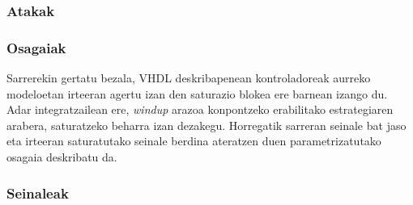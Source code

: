 \subsubsection{Atakak}




\subsubsection{Osagaiak}

Sarrerekin gertatu bezala, VHDL deskribapenean kontroladoreak aurreko modeloetan irteeran agertu izan den saturazio blokea ere barnean izango du. Adar integratzailean ere, \emph{windup} arazoa konpontzeko erabilitako estrategiaren arabera, saturatzeko beharra izan dezakegu. Horregatik sarreran seinale bat jaso eta irteeran saturatutako seinale berdina ateratzen duen parametrizatutako osagaia deskribatu da.

\noindent
\begin{minipage}{.45\textwidth}

\end{minipage}
\hspace{.5em}
\begin{minipage}{.5\textwidth}
\centering

\end{minipage}

\subsubsection{Seinaleak}

